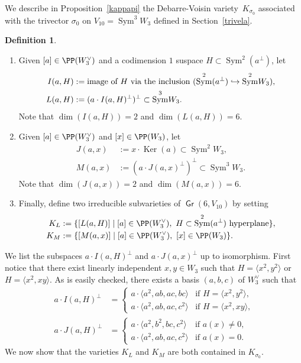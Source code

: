 \documentclass[JEP,XML,SOM,Unicode, NoEqCountersInSection,NoFloatCountersInSection]{cedram}
\newenvironment{enumeratea}
{\bgroup\def\theenumi{\alph{enumi}}\def\theenumii{\arabic{enumii}}\begin{enumerate}}
{\end{enumerate}\egroup}
\newcommand\hto{\mathrel{\lhook\joinrel\to}}
\theoremstyle{definition}
\newtheorem{defi}[lemm]{Definition}
\DeclareMathOperator{\Gr}{\mathsf{Gr}}
\let\la\langle
\let\ra\rangle
\DeclareMathOperator{\Ker}{Ker}
\DeclareMathOperator{\Sym}{Sym}
\begin{document}
We describe in Proposition~\ref{kappapi} the Debarre-Voisin variety~$K_{\sigma_0}$ associated with the trivector $\sigma_0 $ on $V_{10}=\Sym^3 \!W_3 $ defined in Section~\ref{trivela}.


\skpt
\begin{defi}\label{eccolph}
\begin{enumeratea}
\item\label{eccolpha}
Given $[a]\in \PP(W_{3}^{\vee})$ and a codimension $1$ suspace $H\subset\Sym^2(a^{\bot})$, let
\begin{align*}
I(a,H) & := \textnormal{image of $H$ via the inclusion $(\Sym^2(a^{\bot})\hto \Sym^2\! W_{3})$,} \\
L(a,H) & := (a\cdot I(a,H)^{\bot})^{\bot}\subset \Sym^3\! W_{3}.
\end{align*}
Note that $\dim (I(a,H))=2$ and $\dim (L(a,H))=6$.

\item\label{eccolphb}
Given $[a]\in \PP(W_{3}^{\vee})$ and
$[x]\in \PP (W_3)$, let
\begin{align*}
J(a,x) & := x\cdot \Ker(a) \subset \Sym^2\! W_{3}, \\
M(a,x) & := (a\cdot J(a,x)^{\bot})^{\bot}\subset \Sym^3\! W_{3}.
\end{align*}
Note that $\dim (J(a,x))=2$ and $\dim (M(a,x))=6$.

\item\label{eccolphc}
Finally, define two irreducible subvarieties of $ \Gr(6,V_{10})$ by setting
\begin{align*}
K_L & := \{[L(a,H)] \mid [a]\in \PP(W_3^{\vee}),\ H \subset \Sym^2(a^{\bot})\textnormal{ hyperplane}\},\\
K_M & := \{[M(a,x)] \mid [a]\in \PP (W_3^{\vee}),\ [x]\in \PP (W_3)\}.
\end{align*}
\end{enumeratea}
\end{defi}
We list the subspaces $a\cdot I(a,H)^{\bot}$ and $a\cdot J(a,x)^{\bot}$ up to isomorphism. First notice that there exist linearly independent $x,y\!\in\!W_3$ such that $H\!=\!\la x^2,y^2\ra$ or \hbox{$H\!=\!\la x^2,xy\ra$}.
As is easily checked, there exists a basis $(a,b,c)$ of $W_3^{\vee}$ such that
\begin{equation}\label{esplicito}
\begin{aligned}
a\cdot I(a,H)^{\bot}&=
\begin{cases}
a\cdot\la a^2,ab,ac,bc\ra & \text{if $H=\la x^2,y^2\ra$,} \\
a\cdot\la a^2,ab,ac,c^2\ra & \text{if $H=\la x^2,xy\ra$,}
\end{cases}
\\
a\cdot J(a,H)^{\bot}&=
\begin{cases}
a\cdot\la a^2,b^2,bc,c^2\ra & \text{if $a(x)\not=0$,} \\
a\cdot\la a^2,ab,ac,c^2\ra & \text{if $a(x)=0$.}
\end{cases}
\end{aligned}
\end{equation}
We now show that the varieties $K_L$ and $K_M$ are both contained in $K_{\sigma_0}$.
\end{document}
